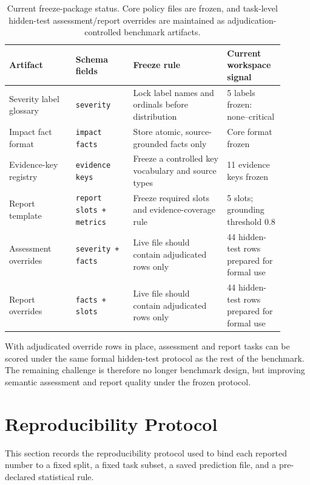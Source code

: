 \documentclass{article}
\begin{document}
\begin{table}[ht]
    \centering
    \small
    \setlength{\tabcolsep}{3pt}
    \caption{Current freeze-package status. Core policy files are frozen, and task-level hidden-test assessment/report overrides are maintained as adjudication-controlled benchmark artifacts.}
    \label{tab:severity-freeze}
    \begin{tabular}{L{0.22\linewidth}L{0.19\linewidth}L{0.31\linewidth}L{0.18\linewidth}}
        \toprule
        Artifact & Schema fields & Freeze rule & Current workspace signal \\
        \midrule
        Severity label glossary & \texttt{severity} & Lock label names and ordinals before distribution & 5 labels frozen: none--critical \\
        Impact fact format & \texttt{impact facts} & Store atomic, source-grounded facts only & Core format frozen \\
        Evidence-key registry & \texttt{evidence keys} & Freeze a controlled key vocabulary and source types & 11 evidence keys frozen \\
        Report template & \texttt{report slots + metrics} & Freeze required slots and evidence-coverage rule & 5 slots; grounding threshold 0.8 \\
        Assessment overrides & \texttt{severity + facts} & Live file should contain adjudicated rows only & 44 hidden-test rows prepared for formal use \\
        Report overrides & \texttt{facts + slots} & Live file should contain adjudicated rows only & 44 hidden-test rows prepared for formal use \\
        \bottomrule
    \end{tabular}
\end{table}

With adjudicated override rows in place, assessment and report tasks can be scored under the same formal hidden-test protocol as the rest of the benchmark. The remaining challenge is therefore no longer benchmark design, but improving semantic assessment and report quality under the frozen protocol.

\section{Reproducibility Protocol}
\label{sec:execution-plan}

This section records the reproducibility protocol used to bind each reported number to a fixed split, a fixed task subset, a saved prediction file, and a pre-declared statistical rule.
\end{document}
